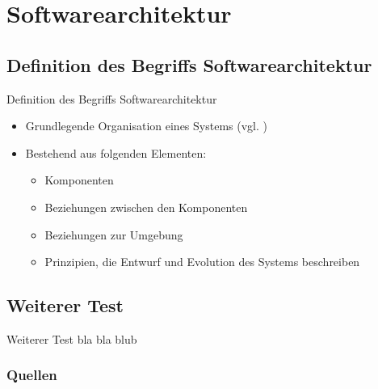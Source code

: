 \documentclass{beamer}
\begin{document}
	\section{Softwarearchitektur}
		\subsection{Definition des Begriffs Softwarearchitektur}
			\begin{frame}{Definition des Begriffs Softwarearchitektur}
				\begin{itemize}
					\item Grundlegende Organisation eines Systems (vgl. \cite{gi-lexikon})
					\item Bestehend aus folgenden Elementen:
					\begin{itemize}
						\item Komponenten
						\item Beziehungen zwischen den Komponenten
						\item Beziehungen zur Umgebung
						\item Prinzipien, die Entwurf und Evolution des Systems beschreiben
					\end{itemize}
				\end{itemize}
			\end{frame}
		\subsection{Weiterer Test}
			\begin{frame}{Weiterer Test}
				bla bla blub
			\end{frame}
	\begin{frame}[allowframebreaks]
		\frametitle{Quellen}
		\printbibliography[heading=none]
	\end{frame}
\end{document}
